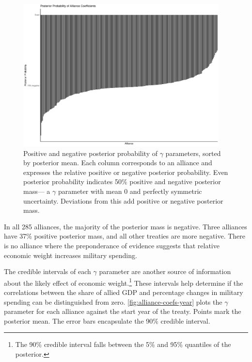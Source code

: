 \documentclass[12pt]{article}
\begin{document}
\begin{figure}[htbp]
	\centering
		\includegraphics[width=0.95\textwidth]{full-post-prob.pdf}
	\caption{Positive and negative posterior probability of $\gamma$ parameters, sorted by posterior mean. Each column corresponds to an alliance and expresses the relative positive or negative posterior probability. Even posterior probability indicates 50\% positive and negative posterior mass--- a $\gamma$ parameter with mean 0 and perfectly symmetric uncertainty. Deviations from this add positive or negative posterior mass.}
	\label{fig:full-post-prob}
\end{figure}


In all 285 alliances, the majority of the posterior mass is negative.  
Three alliances have 37\% positive posterior mass, and all other treaties are more negative. 
There is no alliance where the preponderance of evidence suggests that relative economic weight increases military spending. 


The credible intervals of each $\gamma$ parameter are another source of information about the likely effect of economic weight.\footnote{The 90\% credible interval falls between the 5\% and 95\% quantiles of the posterior.} 
These intervals help determine if the correlations between the share of allied GDP and percentage changes in military spending can be distinguished from zero. 
\autoref{fig:alliance-coefs-year} plots the $\gamma$ parameter for each alliance against the start year of the treaty.
Points mark the posterior mean. 
The error bars encapsulate the 90\% credible interval.
\end{document}
